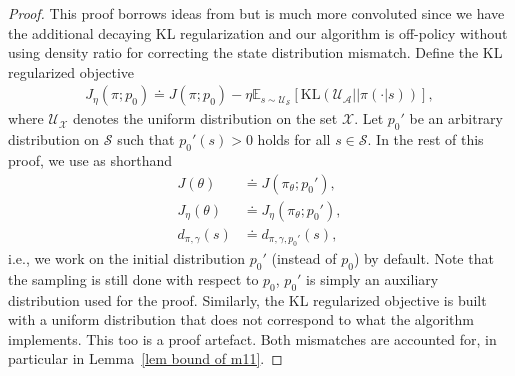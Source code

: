 \documentclass[twoside,11pt]{article}
\newcommand{\fS}{\mathcal{S}}
\newcommand{\fA}{\mathcal{A}}
\newcommand{\fU}{\mathcal{U}}
\newcommand{\E}{\mathbb{E}}
\newcommand{\kl}[2]{\text{KL}\left(#1||#2\right)}
\numberwithin{assucounter}{section}
\begin{document}
\begin{proof}
  This proof borrows ideas from \citet{wu2020finite} but is much more convoluted since we have the additional decaying KL regularization and our algorithm is off-policy without using density ratio for correcting the state distribution mismatch.
  Define the KL regularized objective
  \begin{align}
    \label{eq definition of new objective}
    J_\eta(\pi; p_0) \doteq J(\pi; p_0) - \eta \E_{s \sim \fU_\fS} \left[\kl{\fU_\fA}{\pi(\cdot |s)}\right],
  \end{align}
  where $\fU_\mathcal{X}$ denotes the uniform distribution on the set $\mathcal{X}$.
  Let $p_0'$ be an arbitrary distribution on $\fS$ such that $p_0'(s) > 0$ holds for all $s \in \fS$.
  In the rest of this proof,
  we use as shorthand
  \begin{align}
    \label{eq actor convergence shorthard}
    J(\theta) &\doteq J(\pi_\theta; p_0'), \\
    J_\eta(\theta) &\doteq J_\eta(\pi_\theta; p_0'), \\
    d_{\pi, \gamma}(s) &\doteq d_{\pi, \gamma, p_0'}(s),
  \end{align}
  i.e.,
  we work on the initial distribution $p_0'$ (instead of $p_0$) by default.
  Note that the sampling is still done with respect to $p_0$, $p_0'$ is simply an auxiliary distribution used for the proof. 
  Similarly, the KL regularized objective is built with a uniform distribution that does not correspond to what the algorithm implements. 
  This too is a proof artefact. 
  Both mismatches are accounted for, in particular in Lemma~\ref{lem bound of m11}.


\end{proof}
\end{document}
